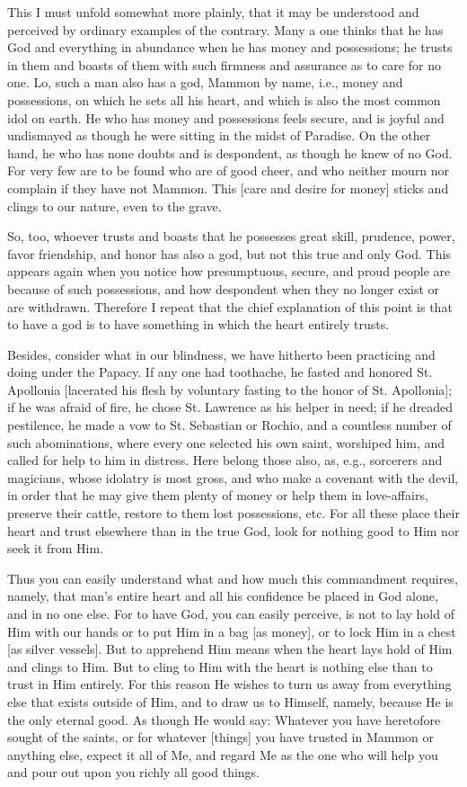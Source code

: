 This I must unfold somewhat more plainly, that it may be understood and
perceived by ordinary examples of the contrary. Many a one thinks that
he has God and everything in abundance when he has money and
possessions; he trusts in them and boasts of them with such firmness
and assurance as to care for no one. Lo, such a man also has a god,
Mammon by name, i.e., money and possessions, on which he sets all his
heart, and which is also the most common idol on earth. He who has
money and possessions feels secure, and is joyful and undismayed as
though he were sitting in the midst of Paradise. On the other hand, he
who has none doubts and is despondent, as though he knew of no God. For
very few are to be found who are of good cheer, and who neither mourn
nor complain if they have not Mammon. This [care and desire for money]
sticks and clings to our nature, even to the grave.

So, too, whoever trusts and boasts that he possesses great skill,
prudence, power, favor friendship, and honor has also a god, but not
this true and only God. This appears again when you notice how
presumptuous, secure, and proud people are because of such
possessions, and how despondent when they no longer exist or are
withdrawn. Therefore I repeat that the chief explanation of this point
is that to have a god is to have something in which the heart entirely
trusts.

Besides, consider what in our blindness, we have hitherto been
practicing and doing under the Papacy. If any one had toothache, he
fasted and honored St. Apollonia [lacerated his flesh by voluntary
fasting to the honor of St. Apollonia]; if he was afraid of fire, he
chose St. Lawrence as his helper in need; if he dreaded pestilence, he
made a vow to St. Sebastian or Rochio, and a countless number of such
abominations, where every one selected his own saint, worshiped him,
and called for help to him in distress. Here belong those also, as,
e.g., sorcerers and magicians, whose idolatry is most gross, and who
make a covenant with the devil, in order that he may give them plenty
of money or help them in love-affairs, preserve their cattle, restore
to them lost possessions, etc. For all these place their heart and
trust elsewhere than in the true God, look for nothing good to Him nor
seek it from Him.

Thus you can easily understand what and how much this commandment
requires, namely, that man's entire heart and all his confidence be
placed in God alone, and in no one else. For to have God, you can
easily perceive, is not to lay hold of Him with our hands or to put Him
in a bag [as money], or to lock Him in a chest [as silver vessels]. But
to apprehend Him means when the heart lays hold of Him and clings to
Him. But to cling to Him with the heart is nothing else than to trust
in Him entirely. For this reason He wishes to turn us away from
everything else that exists outside of Him, and to draw us to Himself,
namely, because He is the only eternal good. As though He would say:
Whatever you have heretofore sought of the saints, or for whatever
[things] you have trusted in Mammon or anything else, expect it all of
Me, and regard Me as the one who will help you and pour out upon you
richly all good things.

